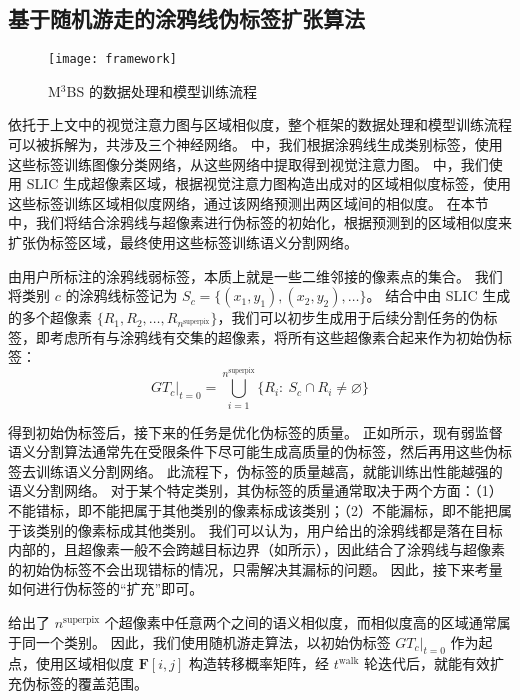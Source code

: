 \subsection{基于随机游走的涂鸦线伪标签扩张算法}
\label{subsec:walk}
\begin{figure}[h]
\centering
\texttt{[image: framework]}
\caption{M$^3$BS 的数据处理和模型训练流程}
\label{fig:framework}
\end{figure}
\par
依托于上文中的视觉注意力图与区域相似度，整个框架的数据处理和模型训练流程可以被拆解为，共涉及三个神经网络。
中，我们根据涂鸦线生成类别标签，使用这些标签训练图像分类网络，从这些网络中提取得到视觉注意力图。
中，我们使用 SLIC 生成超像素区域，根据视觉注意力图构造出成对的区域相似度标签，使用这些标签训练区域相似度网络，通过该网络预测出两区域间的相似度。
在本节中，我们将结合涂鸦线与超像素进行伪标签的初始化，根据预测到的区域相似度来扩张伪标签区域，最终使用这些标签训练语义分割网络。
\par
由用户所标注的涂鸦线弱标签，本质上就是一些二维邻接的像素点的集合。
我们将类别 $c$ 的涂鸦线标签记为 $S_c = \{ (x_1,y_1), (x_2,y_2), \dots \}$。
结合中由 SLIC 生成的多个超像素 $\{ R_1, R_2, \dots, R_{n^\text{superpix}} \}$，我们可以初步生成用于后续分割任务的伪标签，即考虑所有与涂鸦线有交集的超像素，将所有这些超像素合起来作为初始伪标签：
\begin{equation}
GT_c\vert_{t=0} = \bigcup_{i=1}^{n^\text{superpix}} \{ R_i :\ S_c \cap R_i \neq \varnothing \}
\label{eqn:pseudo}
\end{equation}
\par
得到初始伪标签后，接下来的任务是优化伪标签的质量。
正如所示，现有弱监督语义分割算法通常先在受限条件下尽可能生成高质量的伪标签，然后再用这些伪标签去训练语义分割网络。
此流程下，伪标签的质量越高，就能训练出性能越强的语义分割网络。
对于某个特定类别，其伪标签的质量通常取决于两个方面：（1）不能错标，即不能把属于其他类别的像素标成该类别；（2）不能漏标，即不能把属于该类别的像素标成其他类别。
我们可以认为，用户给出的涂鸦线都是落在目标内部的，且超像素一般不会跨越目标边界（如所示），因此结合了涂鸦线与超像素的初始伪标签不会出现错标的情况，只需解决其漏标的问题。
因此，接下来考量如何进行伪标签的“扩充”即可。
\par
{}给出了 $n^\text{superpix}$ 个超像素中任意两个之间的语义相似度，而相似度高的区域通常属于同一个类别。
因此，我们使用随机游走算法\cite{}，以初始伪标签 $GT_c\vert_{t=0}$ 作为起点，使用区域相似度 $\mathbf{F}[i,j]$ 构造转移概率矩阵，经 $t^\text{walk}$ 轮迭代后，就能有效扩充伪标签的覆盖范围。
